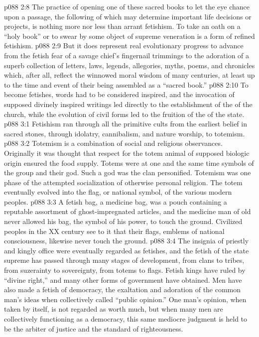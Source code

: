 \vs p088 2:8 The practice of opening one of these sacred books to let the eye chance upon a passage, the following of which may determine important life decisions or projects, is nothing more nor less than arrant fetishism. To take an oath on a “holy book” or to swear by some object of supreme veneration is a form of refined fetishism.
\vs p088 2:9 But it does represent real evolutionary progress to advance from the fetish fear of a savage chief’s fingernail trimmings to the adoration of a superb collection of letters, laws, legends, allegories, myths, poems, and chronicles which, after all, reflect the winnowed moral wisdom of many centuries, at least up to the time and event of their being assembled as a “sacred book.”
\vs p088 2:10 To become fetishes, words had to be considered inspired, and the invocation of supposed divinely inspired writings led directly to the establishment of the  of the church, while the evolution of civil forms led to the fruition of the  of the state.
\vs p088 3:1 Fetishism ran through all the primitive cults from the earliest belief in sacred stones, through idolatry, cannibalism, and nature worship, to totemism.
\vs p088 3:2 Totemism is a combination of social and religious observances. Originally it was thought that respect for the totem animal of supposed biologic origin ensured the food supply. Totems were at one and the same time symbols of the group and their god. Such a god was the clan personified. Totemism was one phase of the attempted socialization of otherwise personal religion. The totem eventually evolved into the flag, or national symbol, of the various modern peoples.
\vs p088 3:3 A fetish bag, a medicine bag, was a pouch containing a reputable assortment of ghost\hyp{}impregnated articles, and the medicine man of old never allowed his bag, the symbol of his power, to touch the ground. Civilized peoples in the XX century see to it that their flags, emblems of national consciousness, likewise never touch the ground.
\vs p088 3:4 The insignia of priestly and kingly office were eventually regarded as fetishes, and the fetish of the state supreme has passed through many stages of development, from clans to tribes, from suzerainty to sovereignty, from totems to flags. Fetish kings have ruled by “divine right,” and many other forms of government have obtained. Men have also made a fetish of democracy, the exaltation and adoration of the common man’s ideas when collectively called “public opinion.” One man’s opinion, when taken by itself, is not regarded as worth much, but when many men are collectively functioning as a democracy, this same mediocre judgment is held to be the arbiter of justice and the standard of righteousness.
